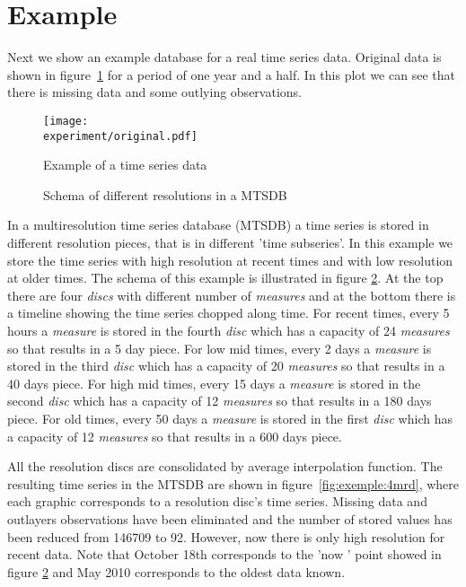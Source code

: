\section{Example}

Next we show an example database for a real time series data. Original
data is shown in figure~\ref{fig:exemple:original} for a period of one
year and a half. In this plot we can see that there is missing
data and some outlying observations.


\begin{figure}[tp]
\centering
\texttt{[image: \\experiment/original.pdf]}
\caption{Example of a time series data}
\label{fig:exemple:original}
\end{figure}



\begin{figure}[tp]
\centering

\caption{Schema of different resolutions in a MTSDB}
\label{fig:exemple:window}
\end{figure}


In a multiresolution time series database (MTSDB) a time series is
stored in different resolution pieces, that is in different 'time
subseries'.  In this example we store the time series with high
resolution at recent times and with low resolution at older times. The
schema of this example is illustrated in figure
\ref{fig:exemple:window}. At the top there are four \emph{discs} with
different number of \emph{measures} and at the bottom there is a
timeline showing the time series chopped along time. For recent times,
every 5 hours a \emph{measure} is stored in the fourth \emph{disc}
which has a capacity of 24 \emph{measures} so that results in a 5 day
piece. For low mid times, every 2 days a \emph{measure} is stored in
the third \emph{disc} which has a capacity of 20 \emph{measures} so
that results in a 40 days piece. For high mid times, every 15 days a
\emph{measure} is stored in the second \emph{disc} which has a
capacity of 12 \emph{measures} so that results in a 180 days
piece. For old times, every 50 days a \emph{measure} is stored in the
first \emph{disc} which has a capacity of 12 \emph{measures} so that
results in a 600 days piece.

All the resolution discs are consolidated by average interpolation
function. The resulting time
series in the MTSDB are shown in figure~\ref{fig:exemple:4mrd}, where
each graphic corresponds to a resolution disc's time series. Missing
data and outlayers observations have been eliminated and the number of
stored values has been reduced from 146709 to 92. However, now there
is only high resolution for recent data. Note that October 18th
corresponds to the 'now ' point showed in figure
\ref{fig:exemple:window} and May 2010 corresponds to the oldest data
known.

